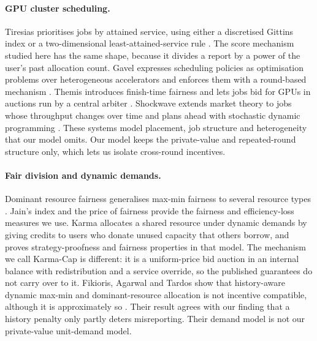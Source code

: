 \documentclass{article}
\theoremstyle{plain}
\theoremstyle{definition}
\begin{document}
\paragraph{GPU cluster scheduling.}
Tiresias prioritises jobs by attained service, using either a discretised Gittins index or a two-dimensional least-attained-service rule \cite{gu2019tiresias}.
The score mechanism studied here has the same shape, because it divides a report by a power of the user's past allocation count.
Gavel expresses scheduling policies as optimisation problems over heterogeneous accelerators and enforces them with a round-based mechanism \cite{narayanan2020gavel}.
Themis introduces finish-time fairness and lets jobs bid for GPUs in auctions run by a central arbiter \cite{mahajan2020themis}.
Shockwave extends market theory to jobs whose throughput changes over time and plans ahead with stochastic dynamic programming \cite{zheng2023shockwave}.
These systems model placement, job structure and heterogeneity that our model omits.
Our model keeps the private-value and repeated-round structure only, which lets us isolate cross-round incentives.

\paragraph{Fair division and dynamic demands.}
Dominant resource fairness generalises max-min fairness to several resource types \cite{ghodsi2011drf}.
Jain's index \cite{jain1984quantitative} and the price of fairness \cite{bertsimas2011price} provide the fairness and efficiency-loss measures we use.
Karma \cite{vuppalapati2023karma} allocates a shared resource under dynamic demands by giving credits to users who donate unused capacity that others borrow, and proves strategy-proofness and fairness properties in that model.
The mechanism we call Karma-Cap is different: it is a uniform-price bid auction in an internal balance with redistribution and a service override, so the published guarantees do not carry over to it.
Fikioris, Agarwal and Tardos show that history-aware dynamic max-min and dominant-resource allocation is not incentive compatible, although it is approximately so \cite{fikioris2021incentives}.
Their result agrees with our finding that a history penalty only partly deters misreporting.
Their demand model is not our private-value unit-demand model.
\end{document}
